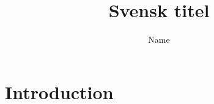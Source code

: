 \documentclass[a4paper,english,10pt,ifm]{liuthesis}
\author{Name}
\title{Svensk titel}{Eng  titel}
\begin{document}



\makeFrontMatter




\chapter{Introduction}
%
\clearpage

%
\clearpage


%
%

\cleardoublepage

\end{document}
